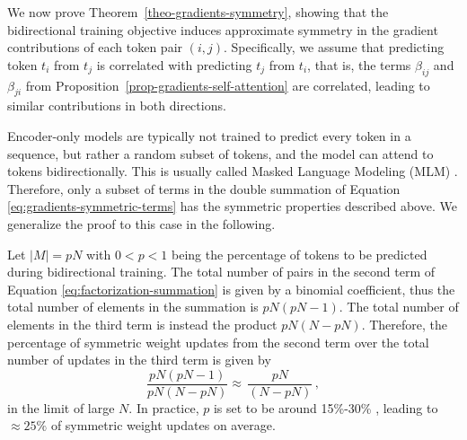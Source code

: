 We now prove Theorem~\ref{theo-gradients-symmetry}, showing that the bidirectional training objective induces approximate symmetry in the gradient contributions of each token pair \( (i, j) \).
%
Specifically, we assume that predicting token \( t_i \) from \( t_j \) is correlated with predicting \( t_j \) from \( t_i \), that is, the terms \( \beta_{ij} \) and \( \beta_{ji} \) from Proposition~\ref{prop-gradients-self-attention} are correlated, leading to similar contributions in both directions.
%

%
Encoder-only models are typically not trained to predict every token in a sequence, but rather a random subset of tokens, and the model can attend to tokens bidirectionally.
%
This is usually called Masked Language Modeling (MLM) \citep{devlinBERTPretrainingDeep2019, liuRoBERTaRobustlyOptimized2019, lanALBERTLiteBERT2020, warnerSmarterBetterFaster2024}.
%
Therefore, only a subset of terms in the double summation of Equation \eqref{eq:gradients-symmetric-terms} has the symmetric properties described above. 
%
We generalize the proof to this case in the following.
%

%
Let $|M| = pN$ with $0<p<1$ being the percentage of tokens to be predicted during bidirectional training.
%
The total number of pairs in the second term of Equation \eqref{eq:factorization-summation} is given by a binomial coefficient, thus the total number of elements in the summation is $pN(pN - 1)$.
%
The total number of elements in the third term is instead the product $pN(N - pN)$.
%
Therefore, the percentage of symmetric weight updates from the second term over the total number of updates in the third term is given by
%
\begin{equation}
    \frac{pN(pN - 1)}{pN(N - pN)} \approx \, \frac{pN}{(N - pN)}\,,
\end{equation}
%
in the limit of large $N$.
%
In practice, $p$ is set to be around 15\%-30\% \citep{devlinBERTPretrainingDeep2019, liuRoBERTaRobustlyOptimized2019,lanALBERTLiteBERT2020,warnerSmarterBetterFaster2024}, leading to $ \approx 25\%$ of symmetric weight updates on average.
%





